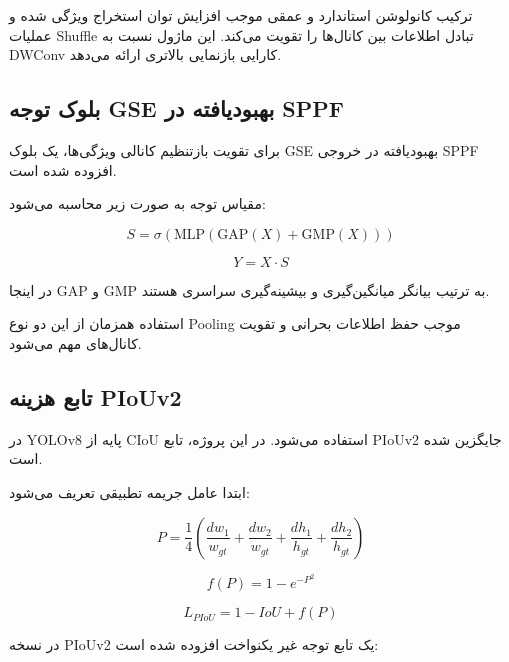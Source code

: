 \documentclass[a4paper, 10pt, twocolumn]{article}
\begin{document}
	ترکیب کانولوشن استاندارد و عمقی موجب افزایش توان استخراج ویژگی شده و عملیات Shuffle تبادل اطلاعات بین کانال‌ها را تقویت می‌کند. این ماژول نسبت به DWConv کارایی بازنمایی بالاتری ارائه می‌دهد.
	
	\subsection{بلوک توجه GSE بهبودیافته در SPPF}
	
	برای تقویت بازتنظیم کانالی ویژگی‌ها، یک بلوک GSE بهبودیافته در خروجی SPPF افزوده شده است.
	
	مقیاس توجه به صورت زیر محاسبه می‌شود:
	
	\begin{equation}
		S = \sigma(\text{MLP}(\text{GAP}(X) + \text{GMP}(X)))
	\end{equation}
	
	\begin{equation}
		Y = X \cdot S
	\end{equation}
	
	در اینجا GAP و GMP به ترتیب بیانگر میانگین‌گیری و بیشینه‌گیری سراسری هستند.
	
	استفاده همزمان از این دو نوع Pooling موجب حفظ اطلاعات بحرانی و تقویت کانال‌های مهم می‌شود.
	
	
	\subsection{تابع هزینه PIoUv2}
	
	در YOLOv8 پایه از CIoU استفاده می‌شود. در این پروژه، تابع PIoUv2 جایگزین شده است.
	
	ابتدا عامل جریمه تطبیقی تعریف می‌شود:
	
	\begin{equation}
		P = \frac{1}{4} \left( \frac{dw_1}{w_{gt}} + \frac{dw_2}{w_{gt}} + \frac{dh_1}{h_{gt}} + \frac{dh_2}{h_{gt}} \right)
	\end{equation}
	
	\begin{equation}
		f(P) = 1 - e^{-P^2}
	\end{equation}
	
	\begin{equation}
		L_{PIoU} = 1 - IoU + f(P)
	\end{equation}
	
	در نسخه PIoUv2 یک تابع توجه غیر یکنواخت افزوده شده است:
	
\end{document}
